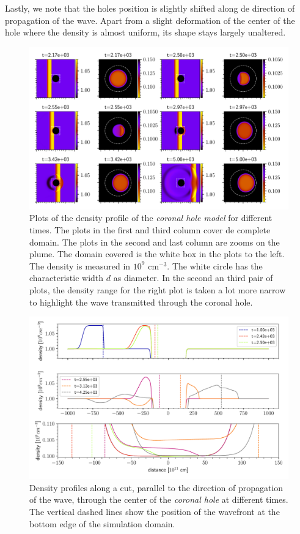 Lastly, we note that the holes position is slightly shifted along de direction of propagation of the wave.
Apart from a slight deformation of the center of the hole where the density is almost uniform, its shape stays largely unaltered.

\begin{figure}[H]
	\centering
	\includegraphics[width=\linewidth]{images/hole-frames.pdf}
	\caption{Plots of the density profile of the \emph{coronal hole model} for different times. 
	The plots in the first and third column cover de complete domain.
	The plots in the second and last column are zooms on the plume. 
	The domain covered is the white box in the plots to the left.
 The density is measured in $10^{9}$ cm$^{-3}$.
The white circle has the characteristic width $d$ as diameter. 
In the second an third pair of plots, the density range for the right plot is taken a lot more narrow to highlight the wave transmitted through the coronal hole.}
	\label{fig:hole-frames}
\end{figure}

\begin{figure}[H]
	\centering
	\includegraphics[width=\linewidth]{images/hole-sections.pdf}
	\caption{Density profiles along a cut, parallel to the direction of propagation of the wave, through the center of the \emph{coronal hole} at different times. The vertical dashed lines show the position of the wavefront at the bottom edge of the simulation domain.}
	\label{fig:hole-sections}
\end{figure}


